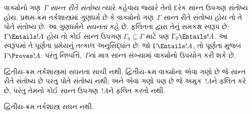 \begingroup
\makeatletter{}\makeatother


\label{guunit:OLP-0334}


\begin{explain}
વાક્યોનો ગણ~$\Gamma$ \emph{સાન્ત રીતે સંતોષ્ય} ત્યારે કહેવાય જ્યારે
તેનો દરેક સાન્ત ઉપગણ સંતોષ્ય હોય. પ્રથમ-ક્રમ તર્કશાસ્ત્રમાં ગુણધર્મ છે
કે વાક્યોનો ગણ~$\Gamma$ સાન્ત રીતે સંતોષ્ય હોય તો તે પોતે
સંતોષ્ય છે. આ ગુણધર્મને \emph{સઘનતા} કહે છે. ફલિતતા દ્વારા તેનું
સમકક્ષ સ્વરૂપ છે: $\Gamma \Entails !A$ હોય તો કોઈ સાન્ત ઉપગણ
$\Gamma_0 \subseteq \Gamma$ માટે પણ $\Gamma_0 \Entails
!A$. આ સ્વરૂપમાં તે પૂર્ણતા પ્રમેયનું તત્કાલ અનુસિદ્ધાંત છે: જો
$\Gamma \Entails !A$, તો પૂર્ણતા મુજબ $\Gamma \Proves !A$. પરંતુ
નિષ્પત્તિ,~$\Gamma$નાં માત્ર સાન્ત સંખ્યામાં વાક્યોનો
ઉપયોગ કરી શકે છે.

દ્વિતીય-ક્રમ તર્કશાસ્ત્રમાં સઘનતા સાચી નથી. દ્વિતીય-ક્રમ
વાક્યોના એવા ગણો છે જે સાન્ત રીતે સંતોષ્ય છે પરંતુ પોતે
સંતોષ્ય નથી; અને એવા ગણો પણ છે જે અમુક~$!A$ને ફલિત કરે છે,
પરંતુ તેમનો કોઈ સાન્ત ઉપગણ~$!A$ને ફલિત કરતો નથી.
\end{explain}


\begin{thm}
દ્વિતીય-ક્રમ તર્કશાસ્ત્ર સઘન નથી.
\end{thm}

